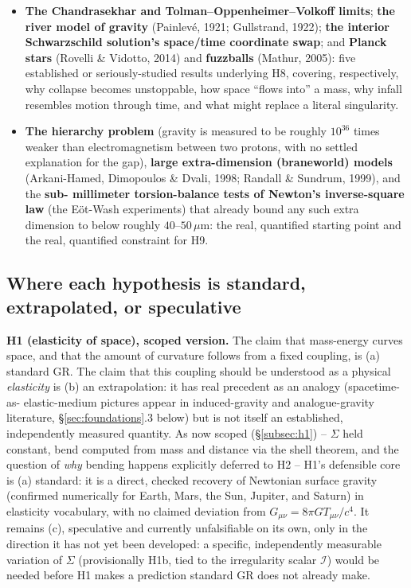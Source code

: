 \documentclass[12pt, a4paper]{article}
\begin{document}
\begin{itemize}
    (Hawking, 1974): four established mechanisms by which a changing
    spacetime or vacuum boundary converts vacuum fluctuations into
    real particles -- the direct precedent for, and current scope of,
    H7.
  \item \textbf{The Chandrasekhar and Tolman--Oppenheimer--Volkoff
    limits}; \textbf{the river model of gravity} (Painlev\'e,
    1921; Gullstrand, 1922); \textbf{the interior Schwarzschild
    solution's space/time coordinate swap}; and \textbf{Planck
    stars} (Rovelli \& Vidotto, 2014) and \textbf{fuzzballs} (Mathur,
    2005): five established or seriously-studied results underlying
    H8, covering, respectively, why collapse becomes unstoppable,
    how space ``flows into'' a mass, why infall resembles motion
    through time, and what might replace a literal singularity.
  \item \textbf{The hierarchy problem} (gravity is measured to be
    roughly $10^{36}$ times weaker than electromagnetism between two
    protons, with no settled explanation for the gap), \textbf{large
    extra-dimension (braneworld) models} (Arkani-Hamed, Dimopoulos \&
    Dvali, 1998; Randall \& Sundrum, 1999), and the \textbf{sub-
    millimeter torsion-balance tests of Newton's inverse-square law}
    (the E\"ot-Wash experiments) that already bound any such extra
    dimension to below roughly $40$--$50\,\mu\mathrm{m}$: the real,
    quantified starting point and the real, quantified constraint for
    H9.
\end{itemize}

\subsection{Where each hypothesis is standard, extrapolated, or speculative}
\textbf{H1 (elasticity of space), scoped version.} The claim that
mass-energy curves space, and that the amount of curvature follows
from a fixed coupling, is (a) standard GR. The claim that this
coupling should be understood as a physical \emph{elasticity} is (b)
an extrapolation: it has real precedent as an analogy (spacetime-as-
elastic-medium pictures appear in induced-gravity and analogue-gravity
literature, \S\ref{sec:foundations}.3 below) but is not itself an
established, independently measured quantity. As now scoped
(\S\ref{subsec:h1}) -- $\Sigma$ held constant, bend computed from
mass and distance via the shell theorem, and the question of
\emph{why} bending happens explicitly deferred to H2 -- H1's
defensible core is (a) standard: it is a direct, checked recovery of
Newtonian surface gravity (confirmed numerically for Earth, Mars, the
Sun, Jupiter, and Saturn) in elasticity vocabulary, with no claimed
deviation from $G_{\mu\nu}=8\pi G T_{\mu\nu}/c^4$. It remains (c),
speculative and currently unfalsifiable on its own, only in the
direction it has not yet been developed: a specific, independently
measurable variation of $\Sigma$ (provisionally H1b, tied to the
irregularity scalar $\mathcal{I}$) would be needed before H1 makes a
prediction standard GR does not already make.
\end{document}
